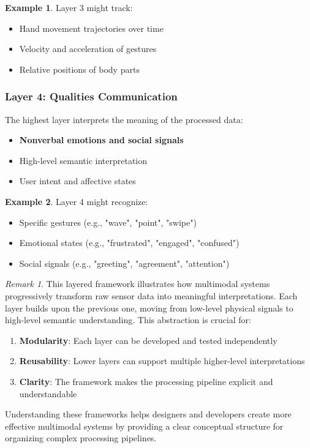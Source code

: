 \documentclass[11pt,a4paper]{article}
\theoremstyle{definition}
\newtheorem{example}{Example}[section]
\theoremstyle{plain}
\theoremstyle{remark}
\newtheorem*{remark}{Remark}
\begin{document}
\begin{example}
Layer 3 might track:
\begin{itemize}
    \item Hand movement trajectories over time
    \item Velocity and acceleration of gestures
    \item Relative positions of body parts
\end{itemize}
\end{example}

\subsubsection{Layer 4: Qualities Communication}

The highest layer interprets the meaning of the processed data:

\begin{itemize}
    \item \textbf{Nonverbal emotions and social signals}
    \item High-level semantic interpretation
    \item User intent and affective states
\end{itemize}

\begin{example}
Layer 4 might recognize:
\begin{itemize}
    \item Specific gestures (e.g., "wave", "point", "swipe")
    \item Emotional states (e.g., "frustrated", "engaged", "confused")
    \item Social signals (e.g., "greeting", "agreement", "attention")
\end{itemize}
\end{example}

\begin{remark}
This layered framework illustrates how multimodal systems progressively transform raw sensor data into meaningful interpretations. Each layer builds upon the previous one, moving from low-level physical signals to high-level semantic understanding. This abstraction is crucial for:
\begin{enumerate}
    \item \textbf{Modularity}: Each layer can be developed and tested independently
    \item \textbf{Reusability}: Lower layers can support multiple higher-level interpretations
    \item \textbf{Clarity}: The framework makes the processing pipeline explicit and understandable
\end{enumerate}

Understanding these frameworks helps designers and developers create more effective multimodal systems by providing a clear conceptual structure for organizing complex processing pipelines.
\end{remark}
\end{document}
